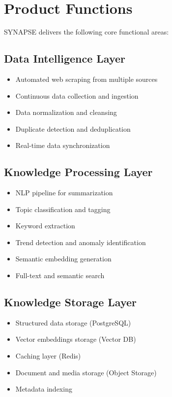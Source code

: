 \documentclass{report}
\begin{document}
\section{Product Functions}
SYNAPSE delivers the following core functional areas:

\subsection{Data Intelligence Layer}
\begin{itemize}
    \item Automated web scraping from multiple sources
    \item Continuous data collection and ingestion
    \item Data normalization and cleansing
    \item Duplicate detection and deduplication
    \item Real-time data synchronization
\end{itemize}

\subsection{Knowledge Processing Layer}
\begin{itemize}
    \item NLP pipeline for summarization
    \item Topic classification and tagging
    \item Keyword extraction
    \item Trend detection and anomaly identification
    \item Semantic embedding generation
    \item Full-text and semantic search
\end{itemize}

\subsection{Knowledge Storage Layer}
\begin{itemize}
    \item Structured data storage (PostgreSQL)
    \item Vector embeddings storage (Vector DB)
    \item Caching layer (Redis)
    \item Document and media storage (Object Storage)
    \item Metadata indexing
\end{itemize}
\end{document}
